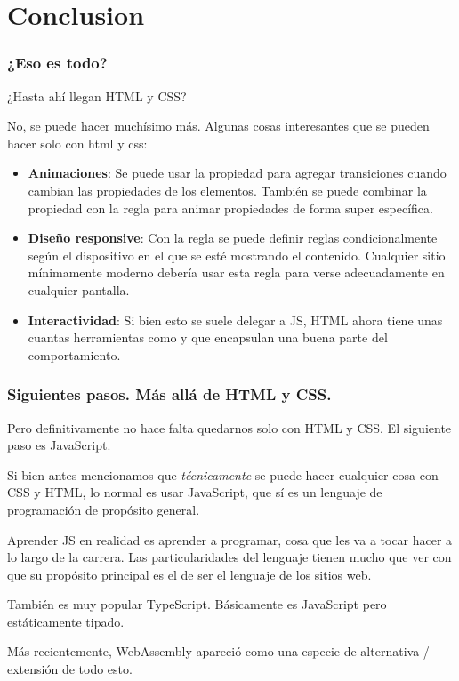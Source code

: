 \section{Conclusion}\label{sec:Conclusion}

\begin{frame}
    \frametitle{¿Eso es todo?}

    ¿Hasta ahí llegan HTML y CSS?

    No, se puede hacer muchísimo más. Algunas cosas interesantes que se pueden hacer 
    solo con html y css:

    \begin{itemize}
        \item \textbf{Animaciones}: Se puede usar la propiedad  
              para agregar transiciones cuando cambian las propiedades de los elementos.
              También se puede combinar la propiedad  con la 
              regla  para animar propiedades de forma super 
              específica.
        \item \textbf{Diseño responsive}: Con la regla  se puede 
              definir reglas condicionalmente según el dispositivo en el que se esté 
              mostrando el contenido. Cualquier sitio mínimamente moderno debería 
              usar esta regla para verse adecuadamente en cualquier pantalla.
        \item \textbf{Interactividad}: Si bien esto se suele delegar a JS, HTML
              ahora tiene unas cuantas herramientas como  y 
               que encapsulan una buena parte del comportamiento.
    \end{itemize}

\end{frame}

\begin{frame}
    \frametitle{Siguientes pasos. Más allá de HTML y CSS.}

    Pero definitivamente no hace falta quedarnos solo con HTML y CSS. El siguiente 
    paso es JavaScript. 

    Si bien antes mencionamos que \emph{técnicamente} se puede hacer cualquier cosa 
    con CSS y HTML, lo normal es usar JavaScript, que sí es un lenguaje de programación 
    de propósito general. 
    
    Aprender JS en realidad es aprender a programar, cosa que les va a tocar hacer a 
    lo largo de la carrera. Las particularidades del lenguaje tienen mucho que ver 
    con que su propósito principal es el de ser el lenguaje de los sitios web. 

    También es muy popular TypeScript. Básicamente es JavaScript pero estáticamente 
    tipado.

    Más recientemente, WebAssembly apareció como una especie de alternativa / 
    extensión de todo esto.

\end{frame}

